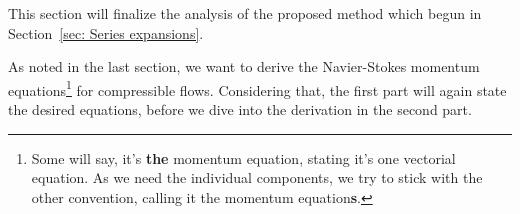 This section will finalize the analysis of the proposed method which begun in Section~\ref{sec: Series expansions}.

As noted in the last section, we want to derive the Navier-Stokes momentum equations\footnote{Some will say, it's \textbf{the} momentum equation, stating it's one vectorial equation.
As we need the individual components, we try to stick with the other convention, calling it the momentum equation\textbf{s}.} for compressible flows.
Considering that, the first part will again state the desired equations, before we dive into the derivation in the second part.
